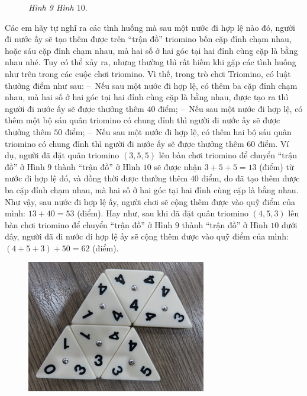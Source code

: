 {\begin{figure}[H]
		\caption{\textit{\small Hình 9 \hspace*{75pt} Hình $10.$}}
		\vspace*{-10pt}
	\end{figure}
	Các em hãy tự nghĩ ra các tình huống mà sau một nước đi hợp lệ nào đó, người đi nước ấy sẽ tạo thêm được trên “trận đồ” triomino bốn cặp đỉnh chạm nhau, hoặc sáu cặp đỉnh chạm nhau, mà hai số ở hai góc tại hai đỉnh cùng cặp là bằng nhau nhé.
	\vskip 0.1cm
	Tuy có thể xảy ra, nhưng thường thì rất hiếm khi gặp các tình huống như trên trong các cuộc chơi triomino. Vì thế, trong trò chơi Triomino, có luật thưởng điểm như sau:
	\vskip 0.1cm
	--\ Nếu sau một nước đi hợp lệ, có thêm ba cặp đỉnh chạm nhau, mà hai số ở hai góc tại hai đỉnh cùng cặp là bằng nhau, được tạo ra thì người đi nước ấy sẽ được thưởng thêm $40$ điểm;
	\vskip 0.1cm
	--\ Nếu sau một nước đi hợp lệ, có thêm một bộ sáu quân triomino có chung đỉnh thì người đi nước ấy sẽ được thưởng thêm $50$ điểm;
	\vskip 0.1cm
	--\ Nếu sau một nước đi hợp lệ, có thêm hai bộ sáu quân triomino có chung đỉnh thì người đi nước ấy sẽ được thưởng thêm $60$ điểm.
	\vskip 0.1cm
	Ví dụ, người đã đặt quân triomino $(3, 5, 5)$ lên bàn chơi triomino để chuyển “trận đồ” ở Hình $9$ thành “trận đồ” ở Hình $10$ sẽ được nhận
	\vskip 0.1cm
	\hspace*{100pt}$3+5+5=13$ (điểm)
	\vskip 0.1cm
	từ nước đi hợp lệ đó, và đồng thời được thưởng thêm $40$ điểm, do đã tạo thêm được ba cặp đỉnh chạm nhau, mà hai số ở hai góc tại hai đỉnh cùng cặp là bằng nhau. Như vậy, sau nước đi hợp lệ ấy, người chơi sẽ cộng thêm được vào quỹ điểm của mình:
	\vskip 0.1cm
	\hspace*{100pt} $13+40=53$ (điểm).
	\vskip 0.1cm
	Hay như, sau khi đã đặt quân triomino $(4, 5, 3)$ lên bàn chơi triomino để chuyển “trận đồ” ở Hình $9$ thành “trận đồ” ở Hình $10$ dưới đây, người đã đi nước đi hợp lệ ấy sẽ cộng thêm được vào quỹ điểm của mình:
	\vskip 0.1cm
	\hspace*{80pt} $(4+5+3)+50 =62$ (điểm).
	\begin{figure}[H]
		\centering
		\captionsetup{labelformat=empty, justification=centering}
		\includegraphics[height=0.3\textwidth]{h9a}

\end{figure}}
